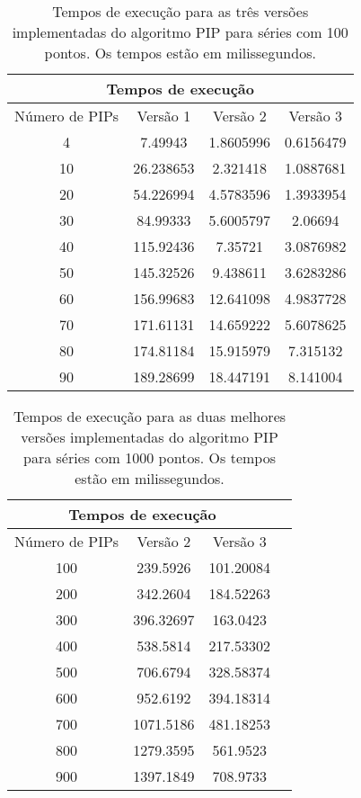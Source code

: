 \begin{table}[htb!]
  \begin{center}
      \begin{tabular}{ | c | c | c | c | }
      \hline
      \multicolumn{4}{|c|}{Tempos de execução} \\
      \hline
      Número de PIPs & Versão 1 & Versão 2 & Versão 3 \\ \hline
      4 & 7.49943    & 1.8605996 & 0.6156479 \\ \hline
      10 & 26.238653 & 2.321418  & 1.0887681 \\ \hline
      20 & 54.226994 & 4.5783596 & 1.3933954 \\ \hline
      30 & 84.99333  & 5.6005797 & 2.06694   \\ \hline
      40 & 115.92436 & 7.35721   & 3.0876982 \\ \hline
      50 & 145.32526 & 9.438611  & 3.6283286 \\ \hline
      60 & 156.99683 & 12.641098 & 4.9837728 \\ \hline
      70 & 171.61131 & 14.659222 & 5.6078625 \\ \hline
      80 & 174.81184 & 15.915979 & 7.315132  \\ \hline
      90 & 189.28699 & 18.447191 & 8.141004  \\
      \hline
      \end{tabular}
  \end{center}
  \caption[Tempos de execução]{Tempos de execução para as três versões implementadas do algoritmo PIP para séries com 100 pontos. Os tempos estão em milissegundos.}
  \label{tab:tempos-100}
\end{table}


\begin{table}[htb!]
  \begin{center}
      \begin{tabular}{ | c | c | c | c | }
      \hline
      \multicolumn{3}{|c|}{Tempos de execução} \\
      \hline
      Número de PIPs & Versão 2 & Versão 3 \\ \hline
      100 & 239.5926  & 101.20084 \\ \hline
      200 & 342.2604  & 184.52263 \\ \hline
      300 & 396.32697 & 163.0423  \\ \hline
      400 & 538.5814  & 217.53302 \\ \hline
      500 & 706.6794  & 328.58374 \\ \hline
      600 & 952.6192  & 394.18314 \\ \hline
      700 & 1071.5186 & 481.18253 \\ \hline
      800 & 1279.3595 & 561.9523  \\ \hline
      900 & 1397.1849 & 708.9733  \\
      \hline
     \end{tabular}
  \end{center}
  \caption[Tempos de execução para as duas melhores versões]{Tempos de execução para as duas melhores versões implementadas do algoritmo PIP para séries com 1000 pontos. Os tempos estão em milissegundos.}
  \label{tab:tempos-1000}
\end{table}

